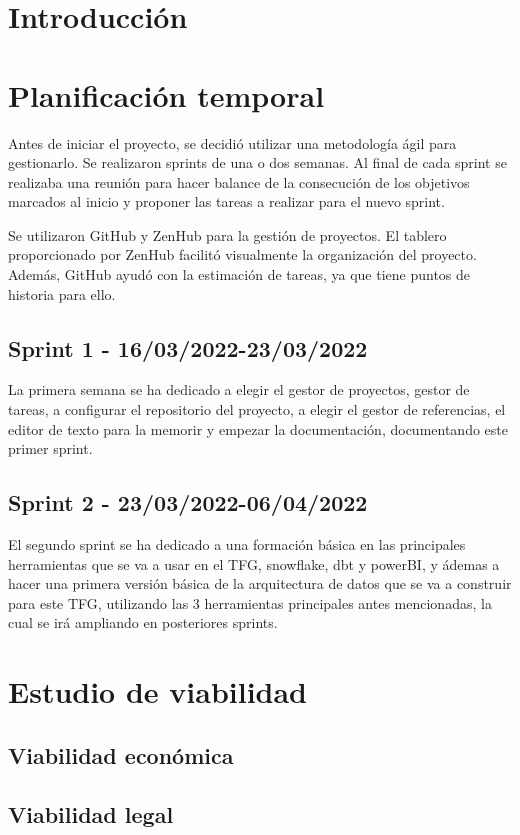 
\section{Introducción}

\section{Planificación temporal}
Antes de iniciar el proyecto, se decidió utilizar una metodología ágil para gestionarlo.
Se realizaron sprints de una o dos semanas. Al final de cada sprint se realizaba una reunión para hacer balance de la consecución de los objetivos marcados al inicio y proponer las tareas a realizar para el nuevo sprint.

Se utilizaron GitHub y ZenHub para la gestión de proyectos. El tablero proporcionado por ZenHub facilitó visualmente la organización del proyecto. Además, GitHub ayudó con la estimación de tareas, ya que tiene puntos de historia para ello.

\subsection{Sprint 1 - 16/03/2022-23/03/2022}
La primera semana se ha dedicado a elegir el gestor de proyectos, gestor de tareas, a configurar el repositorio del proyecto, a elegir el gestor de referencias, el editor de texto para la memorir y empezar la documentación, documentando este primer sprint.
\subsection{Sprint 2 - 23/03/2022-06/04/2022}
El segundo sprint se ha dedicado a una formación básica en las principales herramientas que se va a usar en el TFG, snowflake, dbt y powerBI, y ádemas a hacer una primera versión básica de la arquitectura de datos que se va a construir para este TFG, utilizando las 3 herramientas principales antes mencionadas, la cual se irá ampliando en posteriores sprints. 
\section{Estudio de viabilidad}

\subsection{Viabilidad económica}

\subsection{Viabilidad legal}


